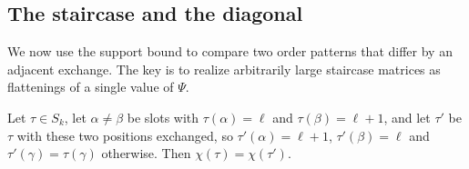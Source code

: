 \subsection{The staircase and the diagonal}

We now use the support bound to compare two order patterns that differ by an adjacent exchange. The key is to
realize arbitrarily large staircase matrices as flattenings of a single value of $\Psi$.

\begin{lemma}[staircase]\label{lem:S}
Let $\tau\in S_k$, let $\alpha\neq\beta$ be slots with $\tau(\alpha)=\ell$ and $\tau(\beta)=\ell+1$, and let $\tau'$ be $\tau$
with these two positions exchanged, so $\tau'(\alpha)=\ell+1$, $\tau'(\beta)=\ell$ and $\tau'(\gamma)=\tau(\gamma)$ otherwise.
Then $\chi(\tau)=\chi(\tau')$.
\end{lemma}


